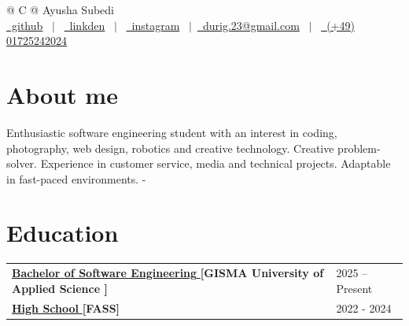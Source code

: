 \documentclass[a4paper,12pt]{article}
\begin{document}
\pagestyle{empty} 



\begin{tabularx}{\linewidth}{@{} C @{}}
\Huge{Ayusha Subedi} \\[7.5pt]
\href{https://github.com/AyushaSubedi23}{\raisebox{-0.05\height}\faGithub\ github} \ $|$ \ 
\href{https://linkedin.com/in/ayusha-subedi-80a786336}{\raisebox{-0.05\height}\faLinkedin\ linkden} 
\ $|$ \ 
\href{https://www.instagram.com/durig_s23}{\raisebox{-0.05\height}\faInstagram\ instagram}
\ $|$\
\href{mailto:email@mysite.com}{\raisebox{-0.05\height}\faEnvelope \ durig.23@gmail.com} \ $|$ \ 
\href{tel:(+49) 01725242024 }{\raisebox{-0.05\height}\faMobile \ (+49) 01725242024 } \\
\end{tabularx}


\section{About me }
Enthusiastic software engineering student with an interest in coding, photography, web design, robotics and creative technology. Creative problem-solver. Experience in customer service, media and technical projects. Adaptable in fast-paced environments.
-
\section{Education}
\begin{tabularx}{\linewidth}{@{}l X@{}}	

\href{https://www.gisma.com/}{\textbf{Bachelor of Software Engineering }} \textbf{[GISMA University of Applied Science ]} & 2025 -- Present \\

\href{https://fass.edu.np/}{\textbf{High School} }\textbf{[FASS]} & 2022 - 2024  \\
\end{tabularx}
\end{document}
